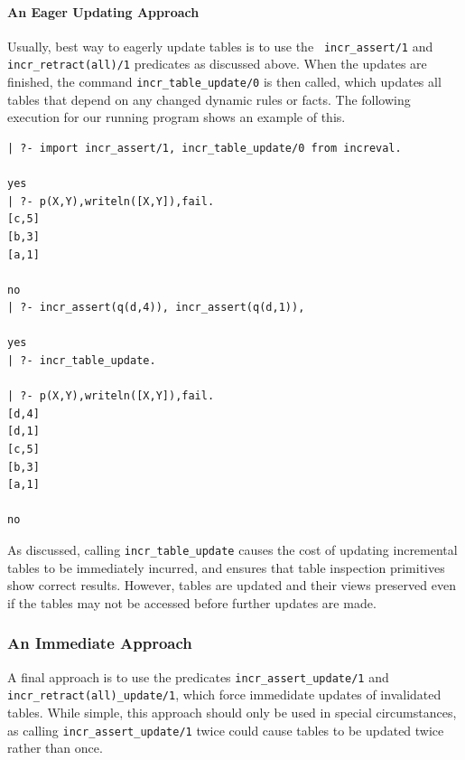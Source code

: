 \paragraph{An Eager Updating Approach}
%
Usually, best way to eagerly update tables is to use the {\tt
  incr\_assert/1} and {\tt incr\_retract(all)/1}
predicates as discussed above.  When the updates are finished, the
command {\tt incr\_table\_update/0} is then called, which updates all
tables that depend on any changed dynamic rules or facts.  The
following execution for our running program shows an example of this.

\begin{verbatim}
| ?- import incr_assert/1, incr_table_update/0 from increval.

yes
| ?- p(X,Y),writeln([X,Y]),fail.
[c,5]
[b,3]
[a,1]

no
| ?- incr_assert(q(d,4)), incr_assert(q(d,1)), 

yes
| ?- incr_table_update.

| ?- p(X,Y),writeln([X,Y]),fail.
[d,4]
[d,1]
[c,5]
[b,3]
[a,1]

no
\end{verbatim}
\noindent
As discussed, calling {\tt incr\_table\_update} causes the cost of
updating incremental tables to be immediately incurred, and ensures
that table inspection primitives show correct results.  However,
tables are updated and their views preserved even if the tables may
not be accessed before further updates are made.

\subsubsection{An Immediate Approach}
%
A final approach is to use the predicates {\tt incr\_assert\_update/1}
and {\tt incr\_retract(all)\_update/1}, which force immedidate updates
of invalidated tables.  While simple, this approach should only be
used in special circumstances, as calling {\tt incr\_assert\_update/1}
twice could cause tables to be updated twice rather than once.


